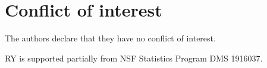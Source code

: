 \section*{Conflict of interest}
%
The authors declare that they have no conflict of interest.

\begin{acknowledgements}
RY is supported partially from NSF Statistics Program DMS 1916037.
\end{acknowledgements}



%
%



